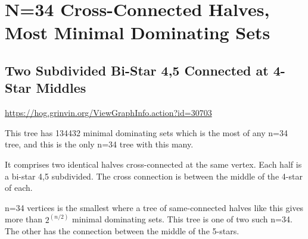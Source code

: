 \documentclass{article}
\begin{document}
\begin{center}
\begin{tikzpicture}
\end{tikzpicture}
\end{center}


\section{N=34 Cross-Connected Halves, Most Minimal Dominating Sets}

\subsection{Two Subdivided Bi-Star 4,5 Connected at 4-Star Middles}

\url{https://hog.grinvin.org/ViewGraphInfo.action?id=30703}

\smallskip

This tree has 134432 minimal dominating sets which is the most of any
n=34 tree, and this is the only n=34 tree with this many.

It comprises two identical halves cross-connected at the same vertex.
Each half is a bi-star 4,5 subdivided.  The cross connection is
between the middle of the 4-star of each.

n=34 vertices is the smallest where a tree of same-connected halves
like this gives more than $2^(n/2)$ minimal dominating sets.  This tree
is one of two such n=34.  The other has the connection between the
middle of the 5-stars.
\end{document}
